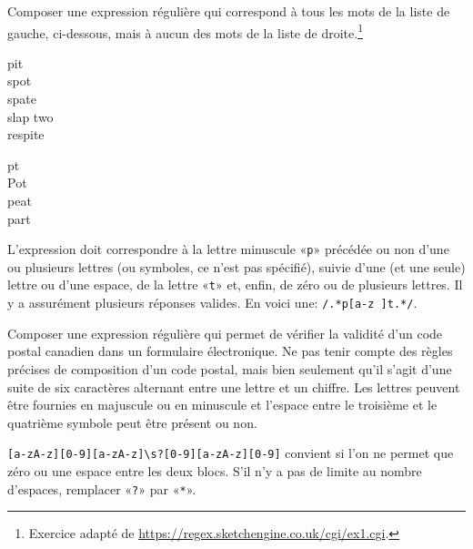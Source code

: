 \begin{exercice}
  Composer une expression régulière qui correspond à tous les mots de
  la liste de gauche, ci-dessous, mais à aucun des mots de la liste de
  droite.\footnote{%
    Exercice adapté de
    \url{https://regex.sketchengine.co.uk/cgi/ex1.cgi}.}
  \begin{center}
    \begin{minipage}[t]{0.3\linewidth}
      pit \\
      spot \\
      spate \\
      slap two \\
      respite
    \end{minipage}
    \begin{minipage}[t]{0.3\linewidth}
      pt \\
      Pot \\
      peat \\
      part
    \end{minipage}
  \end{center}
  \begin{sol}
    L'expression doit correspondre à la lettre minuscule «\verb=p=»
    précédée ou non d'une ou plusieurs lettres (ou symboles, ce n'est
    pas spécifié), suivie d'une (et une seule) lettre ou d'une espace,
    de la lettre «\verb=t=» et, enfin, de zéro ou de plusieurs
    lettres. Il y a assurément plusieurs réponses valides. En voici
    une: \verb=/.*p[a-z ]t.*/=.
  \end{sol}
\end{exercice}

\begin{exercice}
  Composer une expression régulière qui permet de vérifier la validité
  d'un code postal canadien dans un formulaire électronique. Ne pas
  tenir compte des règles précises de composition d'un code postal,
  mais bien seulement qu'il s'agit d'une suite de six caractères
  alternant entre une lettre et un chiffre. Les lettres peuvent être
  fournies en majuscule ou en minuscule et l'espace entre le troisième
  et le quatrième symbole peut être présent ou non.
  \begin{sol}
    \verb=[a-zA-z][0-9][a-zA-z]\s?[0-9][a-zA-z][0-9]=
    convient si l'on ne permet que zéro ou une espace entre les deux
    blocs. S'il n'y a pas de limite au nombre d'espaces, remplacer
    «\verb=?=» par «\verb=*=».
  \end{sol}
\end{exercice}


